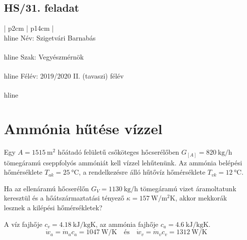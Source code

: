 \documentclass[11pt, a4paper]{report}
\begin{document}
\section*{HS/31. feladat}

\begin{titlepage}{ | p{2cm} | p{14cm} | } 
	\\hline Név: Szigetvári Barnabás\\ 
	\\hline Szak: Vegyészmérnök \\ 
	\\hline Félév: 2019/2020 II. (tavaszi) félév \\ 
	\\hline
\end{titlepage}
\vspace{0.5cm}
\chapter{Ammónia hűtése vízzel} 
Egy $A = 15 \SI{15}{\meter\squared}$ hőátadó felületű csőköteges hőcserélőben $G_[A] = \SI{820}{\kilogram\per\hour}$ tömegáramú cseppfolyós ammóniát kell vízzel lehűtenünk. Az ammónia belépési hőmérséklete $T_{ak} = \SI{25}{\celsius}$, a rendelkezésre álló hűtővíz hőmérséklete $T_{vk} = \SI{12}{\celsius}$.

Ha az ellenáramú hőcserélőn $G_{V} = \SI{1130}{\kilogram\per\hour}$ tömegáramú vizet áramoltatunk keresztül és a hőátszármaztatási tényező $\kappa = \SI{157}{\watt\per\meter\squared\kelvin}$, akkor mekkorák lesznek a kilépési hőmérsékletek?

A víz fajhője $c_v = \SI{4.18}{\kilo\joule\per\kilogram\kelvin}$, az ammónia fajhője $c_a = \SI{4.6}{\kilo\joule\per\kilogram\kelvin}$.
\begin{equation}
\dot{w}_a = \dot{m}_a c_a = \SI{1047}{\watt\per\kelvin} 
\quad \textrm{és} \quad 
\dot{w}_v = \dot{m}_v c_v = \SI{1312}{\watt\per\kelvin} 
\end{equation}

\begin{equation}

\end{equation}
\end{document}
